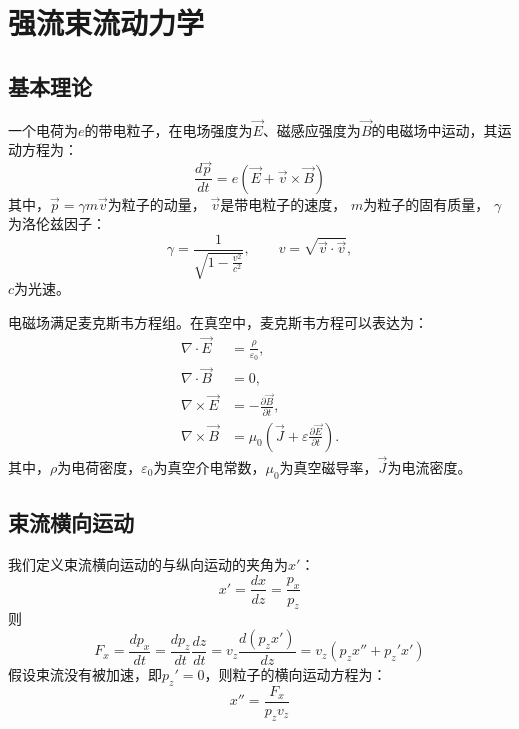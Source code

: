 
\chapter{强流束流动力学}
\label{chap:AccBasic}

\section{基本理论}
一个电荷为$e$的带电粒子，在电场强度为$\vec{E}$、磁感应强度为$\vec{B}$的电磁场中运动，其运动方程为：
\begin{equation}
    \label{eq:Newton}
    \frac{d \vec{p}}{dt}=e(\vec{E}+\vec{v} \times \vec{B})
\end{equation}
其中，$\vec{p}=\gamma m \vec{v}$为粒子的动量，
$\vec{v}$是带电粒子的速度，
$m$为粒子的固有质量，
$\gamma$为洛伦兹因子：
\begin{equation}
    \label{eq:Lorentz}
    \gamma = \frac{1}{\sqrt{1-\frac{v^2}{c^2}}}, \qquad v = \sqrt{\vec{v} \cdot \vec{v}},
\end{equation}
$c$为光速。

电磁场满足麦克斯韦方程组。在真空中，麦克斯韦方程可以表达为：
\begin{equation}
    \label{eq:Maxwell}
    \begin{aligned}
    \nabla \cdot \vec{E}  &= \frac{\rho}{{\varepsilon}_{0}}, \\
    \nabla \cdot \vec{B}  &= 0, \\
    \nabla \times \vec{E} &= -\frac{\partial \vec{B}}{\partial {t}}, \\
    \nabla \times \vec{B} &= {\mu}_{0}\left(\vec{J}+\varepsilon \frac{\partial \vec{E}}{\partial {t}}\right).
    \end{aligned}
\end{equation}
其中，$\rho$为电荷密度，$\varepsilon _0$为真空介电常数，${\mu}_{0}$为真空磁导率，$\vec{J}$为电流密度。

\section{束流横向运动}

我们定义束流横向运动的与纵向运动的夹角为$x'$：
\begin{equation}
    \label{eq:transverse1}
    x'=\frac{dx}{dz}=\frac{p_x}{p_z}
\end{equation}
则
\begin{equation}
    \label{eq:transverse2}
    F_x =\frac{dp_x}{dt}=\frac{dp_z}{dt}\frac{dz}{dt}=v_z \frac{d(p_z x')}{dz}=v_z(p_z x''+p_z'x')
\end{equation}
假设束流没有被加速，即$p_z'=0$，则粒子的横向运动方程为：
\begin{equation}
    \label{eq:transverse3}
    x'' = \frac{F_x}{p_z v_z}
\end{equation}

